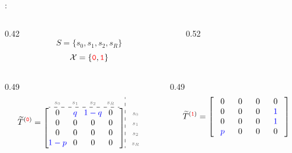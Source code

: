 \documentclass[aspectratio=169,11pt]{beamer}
\newcommand{\uw}[1]{\underline{\smash{#1}}}
\newcommand{\ec}[1]{\makebox[2.15em]{\ensuremath{#1}}}          %
\newcommand{\lc}[1]{\makebox[2.15em]{\ensuremath{\scriptstyle\color{black!55}#1}}} %
\begin{document}
\begin{frame}
  \vspace{0.2em}
  \uw{Example 4}:
  \begin{columns}[c]
    \begin{column}{0.42\textwidth}
      \[ S = \{s_0,s_1,s_2,s_R\} \]
      \[ \mathcal{X} = \{{\color{red}\mathtt{0}},{\color{red}\mathtt{1}}\} \]
    \end{column}
    \begin{column}{0.52\textwidth}
      \begin{center}\scalebox{0.68}{\figExFour}\end{center}
    \end{column}
  \end{columns}

  \vspace{0.1em}
  \begin{columns}[c]
    \begin{column}{0.49\textwidth}
      \[
        \widetilde{T}^{({\color{red}\mathtt{0}})} =
        \begin{array}{@{}c@{}}
          \begin{array}{@{}c@{}c@{}c@{}c@{}}
            \lc{s_0}&\lc{s_1}&\lc{s_2}&\lc{s_R}\\\hdashline\end{array}\\[0.1em]
          \left[\begin{array}{@{}c@{}c@{}c@{}c@{}}
            \ec{0}&\ec{\color{blue}q}&\ec{\color{blue}1-q}&\ec{0}\\
            \ec{0}&\ec{0}&\ec{0}&\ec{0}\\
            \ec{0}&\ec{0}&\ec{0}&\ec{0}\\
            \ec{\color{blue}1-p}&\ec{0}&\ec{0}&\ec{0}
          \end{array}\right]
        \end{array}
        \begin{array}{:@{\,}l@{}}\\[0.1em]\lc{s_0}\\ \lc{s_1}\\ \lc{s_2}\\ \lc{s_R}\end{array}
      \]
    \end{column}
    \begin{column}{0.49\textwidth}
      \[
        \widetilde{T}^{({\color{red}\mathtt{1}})} =
        \left[\begin{array}{@{}c@{}c@{}c@{}c@{}}
          \ec{0}&\ec{0}&\ec{0}&\ec{0}\\
          \ec{0}&\ec{0}&\ec{0}&\ec{\color{blue}1}\\
          \ec{0}&\ec{0}&\ec{0}&\ec{\color{blue}1}\\
          \ec{\color{blue}p}&\ec{0}&\ec{0}&\ec{0}
        \end{array}\right]
      \]
    \end{column}
  \end{columns}
\end{frame}
\end{document}
